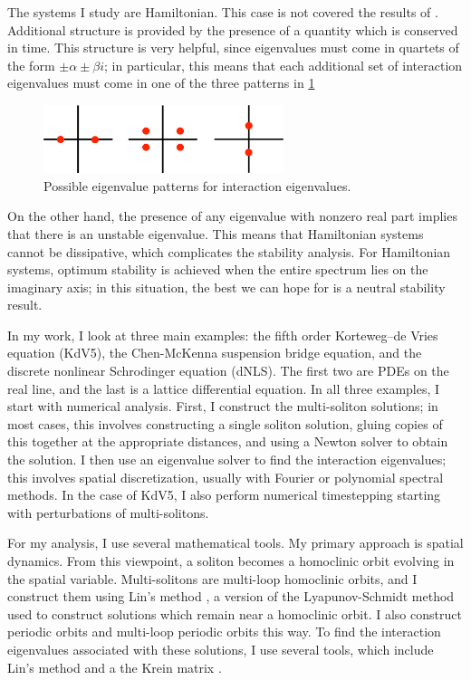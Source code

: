 \documentclass[12pt,reqno]{amsart}
\theoremstyle{definition}
\theoremstyle{remark}
\begin{document}
The systems I study are Hamiltonian. This case is not covered the results of \cite{Sandstede1998}. Additional structure is provided by the presence of a quantity which is conserved in time. This structure is very helpful, since eigenvalues must come in quartets of the form $\pm \alpha \pm \beta i$; in particular, this means that each additional set of interaction eigenvalues must come in one of the three patterns in \cref{fig:inteigpattern}
\begin{figure}[ht]
\centering
\includegraphics[width=7cm]{inteigpattern.eps}
\caption{Possible eigenvalue patterns for interaction eigenvalues.} 
\label{fig:inteigpattern}
\end{figure}
On the other hand, the presence of any eigenvalue with nonzero real part implies that there is an unstable eigenvalue. This means that Hamiltonian systems cannot be dissipative, which complicates the stability analysis. For Hamiltonian systems, optimum stability is achieved when the entire spectrum lies on the imaginary axis; in this situation, the best we can hope for is a neutral stability result. 

In my work, I look at three main examples: the fifth order Korteweg–de Vries equation (KdV5), the Chen-McKenna suspension bridge equation, and the discrete nonlinear Schrodinger equation (dNLS). The first two are PDEs on the real line, and the last is a lattice differential equation. In all three examples, I start with numerical analysis. First, I construct the multi-soliton solutions; in most cases, this involves constructing a single soliton solution, gluing copies of this together at the appropriate distances, and using a Newton solver to obtain the solution. I then use an eigenvalue solver to find the interaction eigenvalues; this involves spatial discretization, usually with Fourier or polynomial spectral methods. In the case of KdV5, I also perform numerical timestepping starting with perturbations of multi-solitons.

For my analysis, I use several mathematical tools. My primary approach is spatial dynamics. From this viewpoint, a soliton becomes a homoclinic orbit evolving in the spatial variable. Multi-solitons are multi-loop homoclinic orbits, and I construct them using Lin's method \cite{Lin2008}, a version of the Lyapunov-Schmidt method used to construct solutions which remain near a homoclinic orbit. I also construct periodic orbits and multi-loop periodic orbits this way. To find the interaction eigenvalues associated with these solutions, I use several tools, which include Lin's method \cite{Sandstede1998} and a the Krein matrix \cite{Kapitula2013a}.
  
\end{document}
